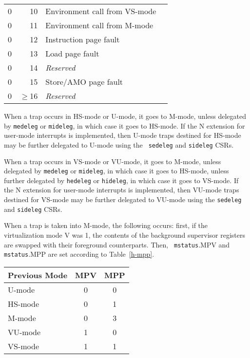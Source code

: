 \begin{table*}[h!]
\begin{center}
\begin{tabular}{|r|r|l|l|}
  0         & 10              & Environment call from VS-mode \\
  0         & 11              & Environment call from M-mode \\
  0         & 12              & Instruction page fault \\
  0         & 13              & Load page fault \\
  0         & 14              & {\em Reserved} \\
  0         & 15              & Store/AMO page fault \\
  0         & $\ge$16         & {\em Reserved} \\
  \hline
\end{tabular}
\end{center}
\caption{Supervisor and machine cause register ({\tt scause} and {\tt mcause}) values when the hypervisor extension is enabled.}
\label{hcauses}
\end{table*}

When a trap occurs in HS-mode or U-mode, it goes to M-mode, unless
delegated by {\tt medeleg} or {\tt mideleg}, in which case it goes to HS-mode.
If the N extension for user-mode interrupts is implemented, then U-mode
traps destined for HS-mode may be further delegated to U-mode using the {\tt
sedeleg} and {\tt sideleg} CSRs.

When a trap occurs in VS-mode or VU-mode, it goes to M-mode, unless
delegated by {\tt medeleg} or {\tt mideleg}, in which case it goes to HS-mode,
unless further delegated by {\tt hedeleg} or {\tt hideleg}, in which case it
goes to VS-mode.  If the N extension for user-mode interrupts is implemented,
then VU-mode traps destined for VS-mode may be further delegated to VU-mode
using the {\tt sedeleg} and {\tt sideleg} CSRs.

When a trap is taken into M-mode, the following occurs: first, if the
virtualization mode V was 1, the contents of the background supervisor
registers are swapped with their foreground counterparts.  Then, {\tt
mstatus}.MPV and {\tt mstatus}.MPP are set according to Table~\ref{h-mpp}.

\begin{table*}[h!]
\begin{center}
\begin{tabular}{|l|c|c|}
  \hline
  Previous Mode & MPV & MPP \\ \hline
  U-mode        & 0   & 0   \\
  HS-mode       & 0   & 1   \\
  M-mode        & 0   & 3   \\ \hline
  VU-mode       & 1   & 0   \\
  VS-mode       & 1   & 1   \\ \hline
\end{tabular}
\end{center}
\caption{Value of {\tt mstatus} fields MPV and MPP after a trap into M-mode.
Upon trap return, MPV is ignored when MPP=3.}
\label{h-mpp}
\end{table*}

